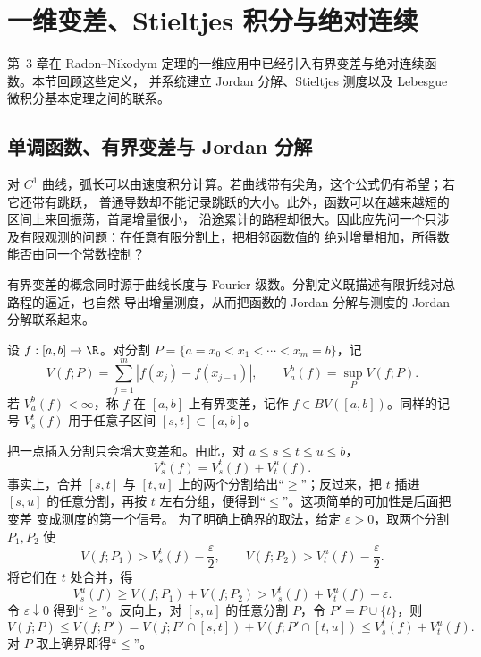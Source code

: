\section{一维变差、Stieltjes 积分与绝对连续}\label{sec:04-02}

第~3 章在 Radon--Nikodym 定理的一维应用中已经引入有界变差与绝对连续函数。本节回顾这些定义，
并系统建立 Jordan 分解、Stieltjes 测度以及 Lebesgue 微积分基本定理之间的联系。

\subsection{单调函数、有界变差与 Jordan 分解}\label{subsec:4-2-1}

对 $C^1$ 曲线，弧长可以由速度积分计算。若曲线带有尖角，这个公式仍有希望；若它还带有跳跃，
普通导数却不能记录跳跃的大小。此外，函数可以在越来越短的区间上来回振荡，首尾增量很小，
沿途累计的路程却很大。因此应先问一个只涉及有限观测的问题：在任意有限分割上，把相邻函数值的
绝对增量相加，所得数能否由同一个常数控制？

有界变差的概念同时源于曲线长度与 Fourier 级数。分割定义既描述有限折线对总路程的逼近，也自然
导出增量测度，从而把函数的 Jordan 分解与测度的 Jordan 分解联系起来。

\begin{definition}[总变差]\label{def:4-2-1-1}
设 $f:[a,b]\to\R$。对分割
$P=\{a=x_0<x_1<\cdots <x_m=b\}$，记
\[
 V(f;P)=\sum_{j=1}^m|f(x_j)-f(x_{j-1})|,
 \qquad
 V_a^b(f)=\sup_P V(f;P).
\]
若 $V_a^b(f)<\infty$，称 $f$ 在 $[a,b]$ 上有界变差，记作
$f\in BV([a,b])$。同样的记号 $V_s^t(f)$ 用于任意子区间 $[s,t]\subset[a,b]$。
\end{definition}

把一点插入分割只会增大变差和。由此，对 $a\le s\le t\le u\le b$，
\begin{equation}\label{eq:4-2-variation-additivity}
 V_s^u(f)=V_s^t(f)+V_t^u(f).
\end{equation}
事实上，合并 $[s,t]$ 与 $[t,u]$ 上的两个分割给出“$\ge$”；反过来，把 $t$ 插进
$[s,u]$ 的任意分割，再按 $t$ 左右分组，便得到“$\le$”。这项简单的可加性是后面把变差
变成测度的第一个信号。
为了明确上确界的取法，给定 $\varepsilon>0$，取两个分割 $P_1,P_2$ 使
\[
 V(f;P_1)>V_s^t(f)-\frac\varepsilon2,\qquad
 V(f;P_2)>V_t^u(f)-\frac\varepsilon2.
\]
将它们在 $t$ 处合并，得
\[
 V_s^u(f)\ge V(f;P_1)+V(f;P_2)
 >V_s^t(f)+V_t^u(f)-\varepsilon.
\]
令 $\varepsilon\downarrow0$ 得到“$\ge$”。反向上，对 $[s,u]$ 的任意分割 $P$，令
$P'=P\cup\{t\}$，则
\[
 V(f;P)\le V(f;P')
 =V(f;P'\cap[s,t])+V(f;P'\cap[t,u])
 \le V_s^t(f)+V_t^u(f).
\]
对 $P$ 取上确界即得“$\le$”。

